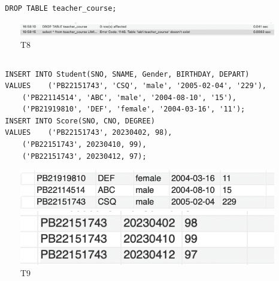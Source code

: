 \documentclass[UTF8]{ctexart}
\begin{document}
\subsection{}
\begin{lstlisting}
  DROP TABLE teacher_course;
\end{lstlisting}
\begin{figure}[H]
  \centering
  \includegraphics[scale=0.4]{pics/8.png}
  \caption*{T8}
\end{figure}

\subsection{}
\begin{lstlisting}
  INSERT INTO Student(SNO, SNAME, Gender, BIRTHDAY, DEPART)
  VALUES	('PB22151743', 'CSQ', 'male', '2005-02-04', '229'),
      ('PB22114514', 'ABC', 'male', '2004-08-10', '15'),
      ('PB21919810', 'DEF', 'female', '2004-03-16', '11');
  INSERT INTO Score(SNO, CNO, DEGREE)
  VALUES	('PB22151743', 20230402, 98),
      ('PB22151743', 20230410, 99),
      ('PB22151743', 20230412, 97);
\end{lstlisting}
\begin{figure}[H]
  \centering
  \begin{minipage}{0.4\linewidth}
    \includegraphics*[scale=0.5]{pics/9_1.png}
  \end{minipage}
  \begin{minipage}{0.4\linewidth}
    \includegraphics*[scale=0.5]{pics/9_2.png}
  \end{minipage}
  \caption*{T9}
\end{figure}
\end{document}
